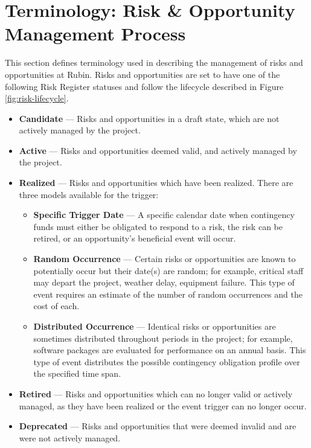 \section{Terminology: Risk \& Opportunity Management Process}
\label{sec:process}

This section defines terminology used in describing the management of risks and opportunities at Rubin.
Risks and opportunities are set to have one of the following Risk Register statuses and follow the lifecycle described in Figure \ref{fig:risk-lifecycle}.

\begin{itemize}
	\item \textbf{Candidate} ---
	Risks and opportunities in a draft state, which are not actively managed by the project.

	\item \textbf{Active} ---
	Risks and opportunities deemed valid, and actively managed by the project.

	\item \textbf{Realized} ---
	Risks and opportunities which have been realized.
	There are three models available for the trigger:
		\begin{itemize}
			\item \textbf{Specific Trigger Date} ---
			A specific calendar date when contingency funds must either be obligated to respond to a risk, the risk can be retired, or an opportunity's beneficial event will occur.

			\item \textbf{Random Occurrence} ---
			Certain risks or opportunities are known to potentially occur but their date(s) are random; for example, critical staff may depart the project, weather delay, equipment failure.
			This type of event requires an estimate of the number of random occurrences and the cost of each.

			\item \textbf{Distributed Occurrence} ---
			Identical risks or opportunities are sometimes distributed throughout periods in the project; for example, software packages are evaluated for performance on an annual basis.
			This type of event distributes the possible contingency obligation profile over the specified time span.
		\end{itemize}

	\item \textbf{Retired} ---
	Risks and opportunities which can no longer valid or actively managed, as they have been realized or the event trigger can no longer occur.

	\item \textbf{Deprecated} ---
	Risks and opportunities that were deemed invalid and are were not actively managed.
\end{itemize}

